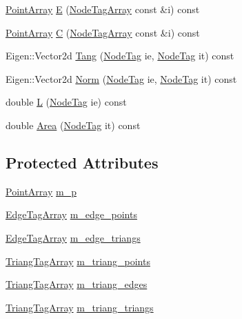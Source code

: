 \begin{DoxyCompactItemize}
\item 
\hyperlink{PointOperations_8h_aa878fb8322bc087b43ba840347e3469a}{Point\+Array} \hyperlink{structTriangMesh_a5604f629630ad7f62eceb8ca96dc0e9f}{E} (\hyperlink{TriangMesh_8h_aec6495913a1e6aad9c6535102a4dd953}{Node\+Tag\+Array} const \&i) const
\item 
\hyperlink{PointOperations_8h_aa878fb8322bc087b43ba840347e3469a}{Point\+Array} \hyperlink{structTriangMesh_a53b88a0e1eec5d79f0f9512f406d3ab1}{C} (\hyperlink{TriangMesh_8h_aec6495913a1e6aad9c6535102a4dd953}{Node\+Tag\+Array} const \&i) const
\item 
Eigen\+::\+Vector2d \hyperlink{structTriangMesh_a49ccf45d946f1b692c4e971e1a5e352e}{Tang} (\hyperlink{structTriangMesh_a9883abab211497b807f24e6e46f4b8f6}{Node\+Tag} ie, \hyperlink{structTriangMesh_a9883abab211497b807f24e6e46f4b8f6}{Node\+Tag} it) const
\item 
Eigen\+::\+Vector2d \hyperlink{structTriangMesh_a630364be0304888840c6d231f5111695}{Norm} (\hyperlink{structTriangMesh_a9883abab211497b807f24e6e46f4b8f6}{Node\+Tag} ie, \hyperlink{structTriangMesh_a9883abab211497b807f24e6e46f4b8f6}{Node\+Tag} it) const
\item 
double \hyperlink{structTriangMesh_a112d9aa92033fd1fcb48379b866ae19e}{L} (\hyperlink{structTriangMesh_a9883abab211497b807f24e6e46f4b8f6}{Node\+Tag} ie) const
\item 
double \hyperlink{structTriangMesh_ad4cc6744df2597c5b6e119adb7d29041}{Area} (\hyperlink{structTriangMesh_a9883abab211497b807f24e6e46f4b8f6}{Node\+Tag} it) const
\end{DoxyCompactItemize}
\subsection*{Protected Attributes}
\begin{DoxyCompactItemize}
\item 
\hyperlink{PointOperations_8h_aa878fb8322bc087b43ba840347e3469a}{Point\+Array} \hyperlink{structTriangMesh_a2079ca25815c1e3234c7a89c28a2cf87}{m\+\_\+p}
\item 
\hyperlink{TriangMesh_8h_abc2bd59f66a99a49734f137afeb7811c}{Edge\+Tag\+Array} \hyperlink{structTriangMesh_aeded3b35e614ebdb4509df84bf74b912}{m\+\_\+edge\+\_\+points}
\item 
\hyperlink{TriangMesh_8h_abc2bd59f66a99a49734f137afeb7811c}{Edge\+Tag\+Array} \hyperlink{structTriangMesh_a55e3d80b81a3744d622e4b5560717f0a}{m\+\_\+edge\+\_\+triangs}
\item 
\hyperlink{TriangMesh_8h_a327fc0ebbe645527e422ebcea99b4cd3}{Triang\+Tag\+Array} \hyperlink{structTriangMesh_a47780d9e5f3c77c75a9d0c7c4b0b2fb4}{m\+\_\+triang\+\_\+points}
\item 
\hyperlink{TriangMesh_8h_a327fc0ebbe645527e422ebcea99b4cd3}{Triang\+Tag\+Array} \hyperlink{structTriangMesh_a62df1a2e039c2ff911a14f856b57e733}{m\+\_\+triang\+\_\+edges}
\item 
\hyperlink{TriangMesh_8h_a327fc0ebbe645527e422ebcea99b4cd3}{Triang\+Tag\+Array} \hyperlink{structTriangMesh_aa0f5b8d8a9c65af1c789051dd10e88b0}{m\+\_\+triang\+\_\+triangs}
\end{DoxyCompactItemize}



